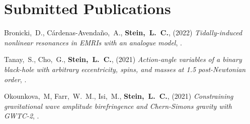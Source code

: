 

\section{\sc Submitted Publications}
\begin{etaremune}[start=\value{pubCounter}]
\item
  Bronicki,~D.,
  Cárdenas-Avendaño,~A.,
  {\bf Stein,~L.~C.},
  (2022)
  {\it Tidally-induced nonlinear resonances in EMRIs with an analogue model},
  .
\item
  Tanay,~S.,
  Cho,~G.,
  {\bf Stein,~L.~C.},
  (2021)
  {\it Action-angle variables of a binary black-hole with arbitrary eccentricity, spins, and masses at 1.5 post-Newtonian order},
  .
\item
  Okounkova,~M,
  Farr,~W.~M.,
  Isi,~M.,
  {\bf Stein,~L.~C.},
  (2021)
  {\it Constraining gravitational wave amplitude birefringence and Chern-Simons gravity with GWTC-2},
  .
  \setcounter{pubCounter}{\value{enumi}}
\end{etaremune}

